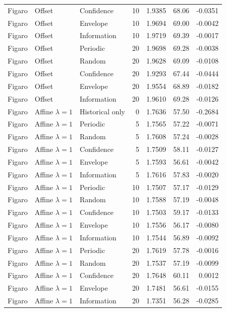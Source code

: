 \begin{longtable}{lllrrrr}
Figaro & Offset & Confidence & 10 & 1.9385 & 68.06 & -0.0351 \\
Figaro & Offset & Envelope & 10 & 1.9694 & 69.00 & -0.0042 \\
Figaro & Offset & Information & 10 & 1.9719 & 69.39 & -0.0017 \\
Figaro & Offset & Periodic & 20 & 1.9698 & 69.28 & -0.0038 \\
Figaro & Offset & Random & 20 & 1.9628 & 69.09 & -0.0108 \\
Figaro & Offset & Confidence & 20 & 1.9293 & 67.44 & -0.0444 \\
Figaro & Offset & Envelope & 20 & 1.9554 & 68.89 & -0.0182 \\
Figaro & Offset & Information & 20 & 1.9610 & 69.28 & -0.0126 \\
Figaro & Affine $\lambda=1$ & Historical only & 0 & 1.7636 & 57.50 & -0.2684 \\
Figaro & Affine $\lambda=1$ & Periodic & 5 & 1.7565 & 57.22 & -0.0071 \\
Figaro & Affine $\lambda=1$ & Random & 5 & 1.7608 & 57.24 & -0.0028 \\
Figaro & Affine $\lambda=1$ & Confidence & 5 & 1.7509 & 58.11 & -0.0127 \\
Figaro & Affine $\lambda=1$ & Envelope & 5 & 1.7593 & 56.61 & -0.0042 \\
Figaro & Affine $\lambda=1$ & Information & 5 & 1.7616 & 57.83 & -0.0020 \\
Figaro & Affine $\lambda=1$ & Periodic & 10 & 1.7507 & 57.17 & -0.0129 \\
Figaro & Affine $\lambda=1$ & Random & 10 & 1.7588 & 57.19 & -0.0048 \\
Figaro & Affine $\lambda=1$ & Confidence & 10 & 1.7503 & 59.17 & -0.0133 \\
Figaro & Affine $\lambda=1$ & Envelope & 10 & 1.7556 & 56.17 & -0.0080 \\
Figaro & Affine $\lambda=1$ & Information & 10 & 1.7544 & 56.89 & -0.0092 \\
Figaro & Affine $\lambda=1$ & Periodic & 20 & 1.7619 & 57.78 & -0.0016 \\
Figaro & Affine $\lambda=1$ & Random & 20 & 1.7537 & 57.19 & -0.0099 \\
Figaro & Affine $\lambda=1$ & Confidence & 20 & 1.7648 & 60.11 & 0.0012 \\
Figaro & Affine $\lambda=1$ & Envelope & 20 & 1.7481 & 56.61 & -0.0155 \\
Figaro & Affine $\lambda=1$ & Information & 20 & 1.7351 & 56.28 & -0.0285 \\

\end{longtable}
